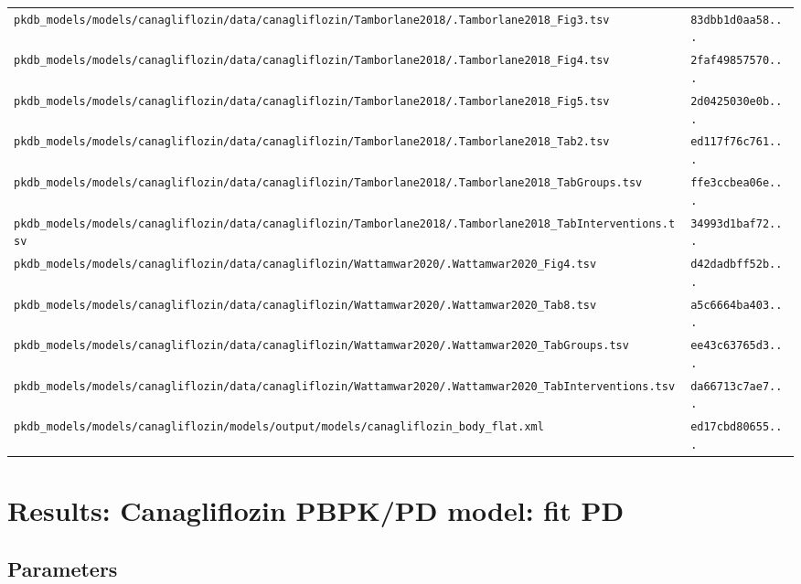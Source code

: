 \begin{longtable}{ll}
\texttt{pkdb\_models/models/canagliflozin/data/canagliflozin/Tamborlane2018/.Tamborlane2018\_Fig3.tsv} & \texttt{83dbb1d0aa58...} \\
\texttt{pkdb\_models/models/canagliflozin/data/canagliflozin/Tamborlane2018/.Tamborlane2018\_Fig4.tsv} & \texttt{2faf49857570...} \\
\texttt{pkdb\_models/models/canagliflozin/data/canagliflozin/Tamborlane2018/.Tamborlane2018\_Fig5.tsv} & \texttt{2d0425030e0b...} \\
\texttt{pkdb\_models/models/canagliflozin/data/canagliflozin/Tamborlane2018/.Tamborlane2018\_Tab2.tsv} & \texttt{ed117f76c761...} \\
\texttt{pkdb\_models/models/canagliflozin/data/canagliflozin/Tamborlane2018/.Tamborlane2018\_TabGroups.tsv} & \texttt{ffe3ccbea06e...} \\
\texttt{pkdb\_models/models/canagliflozin/data/canagliflozin/Tamborlane2018/.Tamborlane2018\_TabInterventions.tsv} & \texttt{34993d1baf72...} \\
\texttt{pkdb\_models/models/canagliflozin/data/canagliflozin/Wattamwar2020/.Wattamwar2020\_Fig4.tsv} & \texttt{d42dadbff52b...} \\
\texttt{pkdb\_models/models/canagliflozin/data/canagliflozin/Wattamwar2020/.Wattamwar2020\_Tab8.tsv} & \texttt{a5c6664ba403...} \\
\texttt{pkdb\_models/models/canagliflozin/data/canagliflozin/Wattamwar2020/.Wattamwar2020\_TabGroups.tsv} & \texttt{ee43c63765d3...} \\
\texttt{pkdb\_models/models/canagliflozin/data/canagliflozin/Wattamwar2020/.Wattamwar2020\_TabInterventions.tsv} & \texttt{da66713c7ae7...} \\
\texttt{pkdb\_models/models/canagliflozin/models/output/models/canagliflozin\_body\_flat.xml} & \texttt{ed17cbd80655...} \\
\end{longtable}

\section{Results: Canagliflozin PBPK/PD model: fit PD}

\subsection{Parameters}

